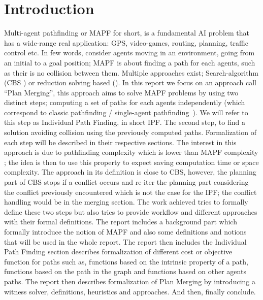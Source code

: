 \section{Introduction}
Multi-agent pathfinding or MAPF \cite{ststfekomawaliatcokubabo19a,ststfekomawaliatcokubabo19b,stern19a} for short, is a fundamental AI problem that has a wide-range real application: GPS, video-games, routing, planning, traffic control etc. In few words, consider agents moving in an environment, going from an initial to a goal position; MAPF is about finding a path for each agents, such as their is no collision between them. Multiple approaches exist; Search-algorithm (CBS \cite{shstfest15a}) or reduction solving based (\cite{barsva19a}). 
In this report we focus on an approach call ``Plan Merging'', this approach aims to solve MAPF problems by using two distinct steps; computing a set of paths for each agents independently (which correspond to classic pathfinding / single-agent pathfinding~\cite{foghkuhagu21a}). We will refer to this step as Individual Path Finding, in short IPF. The second step, to find a solution avoiding collision using the previously computed paths. Formalization of each step will be described in their respective sections. The interest in this approach is due to pathfinding complexity which is lower than MAPF complexity \cite{nebel19a}; the idea is then to use this property to expect saving computation time or space complexity. 
The approach in its definition is close to CBS, however, the planning part of CBS stops if a conflict occurs and re-iter the planning part considering the conflict previously encountered which is not the case for the IPF; the conflict handling would be in the merging section.
The work achieved tries to formally define these two steps but also tries to provide workflow and different approaches with their formal definitions. The report includes a background part which formally introduce the notion of MAPF and also some definitions and notions that will be used in the whole report. The report then includes the Individual Path Finding section describes formalization of different cost or objective function for paths such as, functions based on the intrinsic property of a path, functions based on the path in the graph and functions based on other agents paths. The report then describes formalization of Plan Merging by introducing a witness solver, definitions, heuristics and approaches. And then, finally conclude. 

